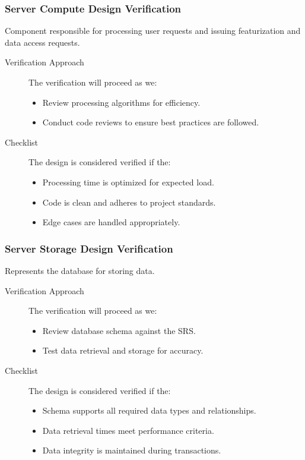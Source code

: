 \documentclass[12pt, titlepage]{article}
\begin{document}
\subsubsection{Server Compute Design Verification}
Component responsible for processing user requests and issuing featurization and data access requests.
\begin{description}
  \item[Verification Approach] The verification will proceed as we:
  \begin{itemize}[leftmargin=0cm]
    \item Review processing algorithms for efficiency.
    \item Conduct code reviews to ensure best practices are followed.
  \end{itemize}
  \item[Checklist] The design is considered verified if the:
    \begin{itemize}[label=$\square$,leftmargin=0cm]
    \item Processing time is optimized for expected load.
    \item Code is clean and adheres to project standards.
    \item Edge cases are handled appropriately.
  \end{itemize}
\end{description}

\subsubsection{Server Storage Design Verification}
Represents the database for storing data.
\begin{description}
  \item[Verification Approach] The verification will proceed as we:
  \begin{itemize}[leftmargin=0cm]
    \item Review database schema against the SRS.
    \item Test data retrieval and storage for accuracy.
  \end{itemize}
  \item[Checklist] The design is considered verified if the:
    \begin{itemize}[label=$\square$,leftmargin=0cm]
    \item Schema supports all required data types and relationships.
    \item Data retrieval times meet performance criteria.
    \item Data integrity is maintained during transactions.
  \end{itemize}
\end{description}
\end{document}
